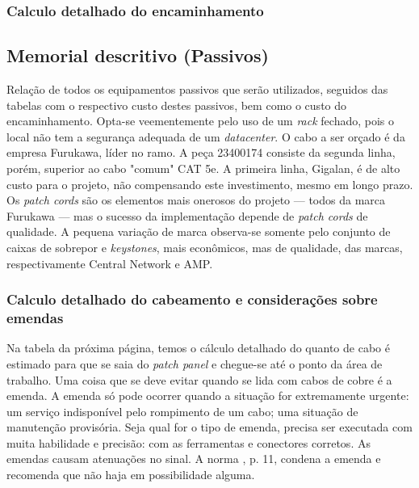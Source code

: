 \documentclass[	DIV=calc,%
							paper=a4,%
							fontsize=12pt,%
							onecolumn]{scrartcl}	 					%
\begin{document}


\subsubsection{Calculo detalhado do encaminhamento}








\subsection{Memorial descritivo (Passivos)}

Relação de todos os equipamentos passivos que serão utilizados, seguidos das tabelas com o respectivo custo destes passivos, bem como o custo do encaminhamento. Opta-se veementemente pelo uso de um \textit{rack} fechado, pois o local não tem a segurança adequada de um \textit{datacenter}. O cabo a ser orçado é da empresa Furukawa, líder no ramo. A peça 23400174 consiste da segunda linha, porém, superior ao cabo "comum" CAT 5e. A primeira linha, Gigalan, é de alto custo para o projeto, não compensando este investimento, mesmo em longo prazo. Os \textit{patch cords} são os elementos mais onerosos do projeto --- todos da marca Furukawa --- mas o sucesso da implementação depende de \textit{patch cords} de qualidade. A pequena variação de marca observa-se somente pelo conjunto de caixas de sobrepor e \textit{keystones}, mais econômicos, mas de qualidade, das marcas, respectivamente Central Network e AMP.





\subsubsection{Calculo detalhado do cabeamento e considerações sobre emendas}

Na tabela da próxima página, temos o cálculo detalhado do quanto de cabo é estimado para que se saia do \textit{patch panel} e chegue-se até o ponto da área de trabalho. Uma coisa que se deve evitar quando se lida com cabos de cobre é a emenda. A emenda só pode ocorrer quando a situação for extremamente urgente: um serviço indisponível pelo rompimento de um cabo; uma situação de manutenção provisória. Seja qual for o tipo de emenda, precisa ser executada com muita habilidade e precisão: com as ferramentas e conectores corretos. As emendas causam atenuações no sinal. A norma \cite{abnt14565}, p. 11, condena a emenda e recomenda que não haja em possibilidade alguma.
\end{document}

